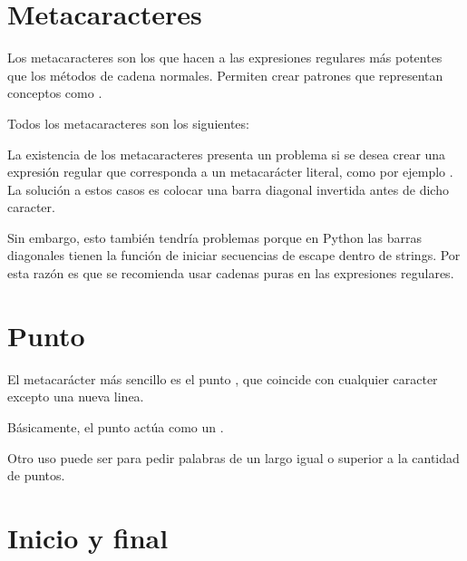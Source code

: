 \section{Metacaracteres}

Los metacaracteres son los que hacen a las expresiones regulares más potentes que los métodos de cadena normales. Permiten crear patrones que representan conceptos como .\smallskip

Todos los metacaracteres son los siguientes:


La existencia de los metacaracteres presenta un problema si se desea crear una expresión regular que corresponda a un metacarácter literal, como por ejemplo . La solución a estos casos es colocar una barra diagonal invertida \ttt{\textbackslash} antes de dicho caracter.\smallskip

Sin embargo, esto también tendría problemas porque en Python las barras diagonales \ttt{\textbackslash} tienen la función de iniciar secuencias de escape dentro de strings. Por esta razón es que se recomienda usar cadenas puras en las expresiones regulares.


\section{Punto}

El metacarácter más sencillo es el punto , que coincide con cualquier caracter excepto una nueva linea.



Básicamente, el punto  actúa como un .\smallskip

Otro uso puede ser para pedir palabras de un largo igual o superior a la cantidad de puntos.


\section{Inicio y final}

